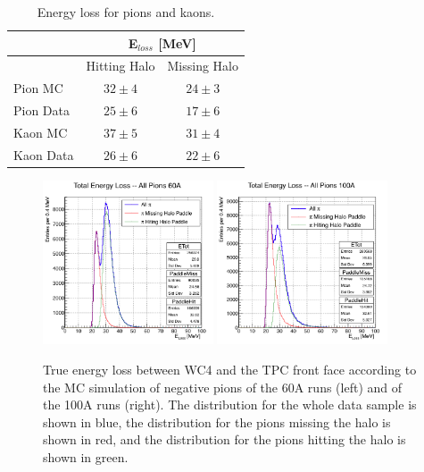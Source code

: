 \begin{table}[b]
\centering
\begin{tabular}{|l|c|c|}  
\hline
                          &  \multicolumn{2}{c|}{E$_{loss}$ [MeV]}    \\ \hline
                          & Hitting Halo          & Missing Halo     \\ \hline
Pion  MC           &  $32 \pm 4 $         &    $24 \pm 3$     \\ \hline
Pion Data          &  $25 \pm 6$          &    $17 \pm 6 $    \\ \hline
Kaon  MC          &  $37 \pm 5 $        &     $31 \pm 4 $    \\ \hline
Kaon Data         &  $26 \pm 6 $        &     $22 \pm 6 $    \\ \hline
\end{tabular}
\caption{Energy loss for pions and kaons.}
\label{tab:Eloss}
\end{table}





\begin{figure}[hbpt]
\centering
\includegraphics[width=0.45\textwidth]{Chapter-5/Images/E_loss60A.png}
\includegraphics[width=0.45\textwidth]{Chapter-5/Images/E_loss100A.png}
\caption{True energy loss between WC4 and the TPC front face according to the MC simulation of negative pions of the 60A runs (left) and of the 100A runs (right). The distribution for the whole data sample is shown in blue, the distribution for the pions missing the halo is shown in red, and the distribution for the pions hitting the halo is shown in green.  }
\label{fig:ELoss60A}
\end{figure}

